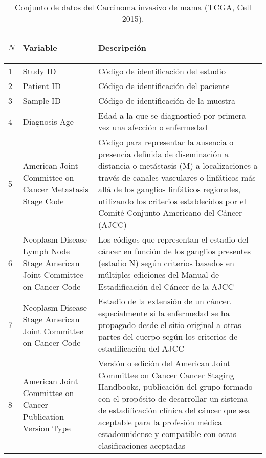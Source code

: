 \begin{table*} [!htb]
	\footnotesize
	\begin{threeparttable}
		\caption{Conjunto de datos del Carcinoma invasivo de mama (TCGA, Cell 2015).}
		\label{brca_tcga_pub2015_clinical_data}
		\begin{tabular}{p{1cm} p{4cm} p{10cm}} \toprule	
			\begin{center}$N$\end{center}   
			&\begin{center}Variable\end{center}             
			&\begin{center}Descripción\end{center}      
			\\ \hline	1	&	Study ID	&	Código de identificación del estudio
			\\ \hline	2	&	Patient ID	&	Código de identificación del paciente
			\\ \hline	3	&	Sample ID	&	Código de identificación de la muestra
			\\ \hline	4	&	Diagnosis Age	&	Edad a la que se diagnosticó por primera vez una afección o enfermedad
			\\ \hline	5	&	American Joint Committee on Cancer Metastasis Stage Code	&	Código para representar la ausencia o presencia definida de diseminación a distancia o metástasis (M) a localizaciones a través de canales vasculares o linfáticos más allá de los ganglios linfáticos regionales, utilizando los criterios establecidos por el Comité Conjunto Americano del Cáncer (AJCC)
			\\ \hline	6	&	Neoplasm Disease Lymph Node Stage American Joint Committee on Cancer Code	&	Los códigos que representan el estadio del cáncer en función de los ganglios presentes (estadio N) según criterios basados en múltiples ediciones del Manual de Estadificación del Cáncer de la AJCC
			\\ \hline	7	&	Neoplasm Disease Stage American Joint Committee on Cancer Code	&	Estadio de la extensión de un cáncer, especialmente si la enfermedad se ha propagado desde el sitio original a otras partes del cuerpo según los criterios de estadificación del AJCC
			\\ \hline	8	&	American Joint Committee on Cancer Publication Version Type	&	Versión o edición del American Joint Committee on Cancer Cancer Staging Handbooks, publicación del grupo formado con el propósito de desarrollar un sistema de estadificación clínica del cáncer que sea aceptable para la profesión médica estadounidense y compatible con otras clasificaciones aceptadas

\end{tabular}
\end{threeparttable}
\end{table*}
